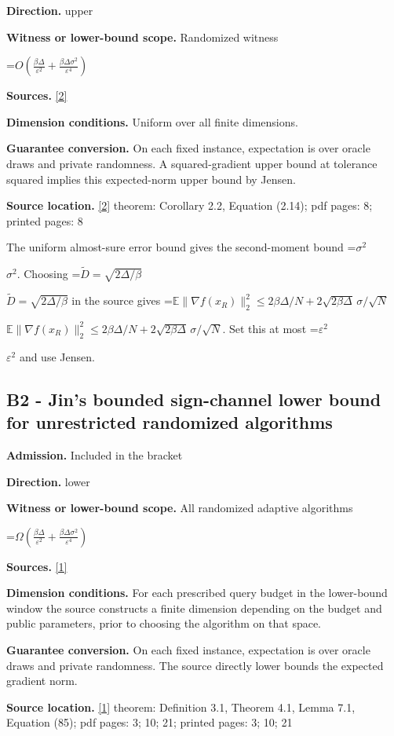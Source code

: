 \documentclass[10pt,a4paper]{article}
\newcommand{\AtlasMath}[1]{\par\begingroup\centering\setbox0=\hbox{$\displaystyle #1$}\ifdim\wd0>1.4\linewidth\typeout{ATLAS WIDE FORMULA: \the\wd0}\fi\ifdim\wd0>\linewidth\resizebox{\linewidth}{!}{\box0}\else\box0\fi\par\endgroup}
\newcommand{\AtlasInlineMath}[1]{\begingroup\setbox0=\hbox{$#1$}\ifdim\wd0>.4\linewidth\endgroup\AtlasMath{#1}\else\endgroup$#1$\fi}
\begin{document}
\textbf{Direction.} upper

\textbf{Witness or lower-bound scope.} Randomized witness

\AtlasMath{O\!\left(\frac{\beta\Delta}{\varepsilon^2}+\frac{\beta\Delta\sigma^2}{\varepsilon^4}\right)}
\textbf{Sources.} \href{https://arxiv.org/pdf/1309.5549}{[2]}

\textbf{Dimension conditions.} Uniform over all finite dimensions.

\textbf{Guarantee conversion.} On each fixed instance, expectation is over oracle draws and private randomness. A squared-gradient upper bound at tolerance squared implies this expected-norm upper bound by Jensen.

\textbf{Source location.} \href{https://arxiv.org/pdf/1309.5549}{[2]} theorem: Corollary 2.2, Equation (2.14); pdf pages: 8; printed pages: 8

The uniform almost-sure error bound gives the second-moment bound \AtlasInlineMath{\sigma^2}. Choosing \AtlasInlineMath{\widetilde D=\sqrt{2\Delta/\beta}} in the source gives \AtlasInlineMath{\mathbb E\|\nabla f(x_R)\|_2^2\le2\beta\Delta/N+2\sqrt{2\beta\Delta}\,\sigma/\sqrt N}. Set this at most \AtlasInlineMath{\varepsilon^2} and use Jensen.

\subsection{B2 - Jin's bounded sign-channel lower bound for unrestricted randomized algorithms}
\textbf{Admission.} Included in the bracket

\textbf{Direction.} lower

\textbf{Witness or lower-bound scope.} All randomized adaptive algorithms

\AtlasMath{\Omega\!\left(\frac{\beta\Delta}{\varepsilon^2}+\frac{\beta\Delta\sigma^2}{\varepsilon^4}\right)}
\textbf{Sources.} \href{https://arxiv.org/pdf/2608.09004v1}{[1]}

\textbf{Dimension conditions.} For each prescribed query budget in the lower-bound window the source constructs a finite dimension depending on the budget and public parameters, prior to choosing the algorithm on that space.

\textbf{Guarantee conversion.} On each fixed instance, expectation is over oracle draws and private randomness. The source directly lower bounds the expected gradient norm.

\textbf{Source location.} \href{https://arxiv.org/pdf/2608.09004v1}{[1]} theorem: Definition 3.1, Theorem 4.1, Lemma 7.1, Equation (85); pdf pages: 3; 10; 21; printed pages: 3; 10; 21
\end{document}
